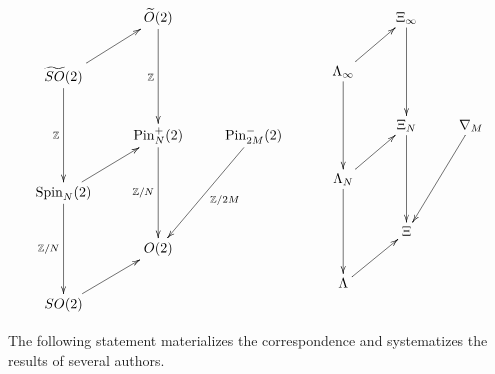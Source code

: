 \documentclass[english,11pt,leqno]{article}
\def\ZZ{\mathbb{Z}}
\def\on{\operatorname}
\theoremstyle{definition}
\theoremstyle{remark}
\numberwithin{equation}{section}
\begin{document}
\vfill\eject
   
\begin{table}[h]
   \[
    \xymatrix{
   &\widetilde{O}(2)
   \ar[dd]_{ \ZZ}
    &
   \\
  \widetilde{SO}(2) \ar[ur]
   \ar[dd]_{ \ZZ}&&
   \\
   &\on{Pin}^+_N(2)
    \ar[dd]_{\ZZ/N}
&\on{Pin}^-_{2M}(2)
\ar[ddl]^{\ZZ/2M}
   \\
   \on{Spin}_N(2)
   \ar[ur]
   \ar[dd]_{\ZZ/N}
  &&
   \\
  & O(2) &\\
   SO(2)
   \ar[ur]&&
   }
\quad\quad\quad
   \xymatrix{
   &\Xi_\infty 
   \ar[dd]_{}\\
  \Lambda_\infty \ar[ur]_{}
   \ar[dd]_{}&&
   \\
   &\Xi_N 
    \ar[dd]_{}
&\nabla_M
\ar[ddl]^{}
   \\
   \Lambda_N
   \ar[ur]_{}
   \ar[dd]_{}
  &&
   \\
  & \Xi &\\
   \Lambda
   \ar[ur]_{}&&
   }
 \]
   \caption{Correspondence between planar crossed simplicial groups and planar Lie groups.}\label{table:galois}
\end{table}
    
The following statement materializes the correspondence and systematizes the results of several authors.
    
\end{document}
